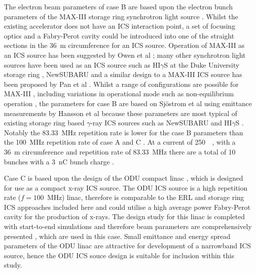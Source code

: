 \documentclass[../main.tex]{subfiles}
\begin{document}
The electron beam parameters of case B are based upon the electron bunch parameters of the MAX-III storage ring synchrotron light source \cite{sjostrom2009max,hansson2011imaging,rosborg2012electron}. Whilst the existing accelerator does not have an ICS interaction point, a set of focusing optics and a Fabry-Perot cavity could be introduced into one of the straight sections in the 36~\si{\metre} circumference for an ICS source. Operation of MAX-III as an ICS source has been suggested by Owen et al \cite{owen2013nonequilibrium}; many other synchrotron light sources have been used as an ICS source such as HI$\gamma$S at the Duke University storage ring \cite{weller2009research}, NewSUBARU \cite{utsunomiya2015gamma} and a similar design to a MAX-III ICS source has been proposed by Pan et al \cite{pan2019design}. Whilst a range of configurations are possible for MAX-III \cite{sjostrom2009max}, including variations in operational mode such as non-equilibrium operation \cite{owen2012modular}, the parameters for case B are based on Sj\"{o}strom et al \cite{sjostrom2009max} using emittance measurements by Hansson et al \cite{hansson2011imaging} because these parameters are most typical of existing storage ring based $\gamma$-ray ICS sources such as NewSUBARU \cite{utsunomiya2015gamma} and HI$\gamma$S \cite{weller2009research}. Notably the 83.33~\si{\mega\hertz} repetition rate is lower for the case B parameters than the 100~\si{\mega\hertz} repetition rate of case A and C \cite{sjostrom2009max,rosborg2012electron}. At a current of 250~\si{\milli\amperes}, with a 36~\si{\meter} circumference and repetition rate of 83.33~\si{\mega\hertz} \cite{sjostrom2009max,rosborg2012electron} there are a total of 10 bunches with a 3~\si{\nano\coulomb} bunch charge .

Case C is based upon the design of the ODU compact linac \cite{krafft2016laser,deitrick2017inverse,deitrick2018high}, which is designed for use as a compact x-ray ICS source. The ODU ICS source is a high repetition rate ($f = 100$~\si{\mega\hertz}) linac, therefore is comparable to the ERL and storage ring ICS approaches included here and could utilise a high average power Fabry-Perot cavity for the production of x-rays. The design study for this linac is completed with start-to-end simulations and therefore beam parameters are comprehensively presented \cite{deitrick2017inverse,deitrick2018high}, which are used in this case. Small emittance and energy spread parameters of the ODU linac are attractive for development of a narrowband ICS source, hence the ODU ICS souce design is suitable for inclusion within this study.  
\end{document}

